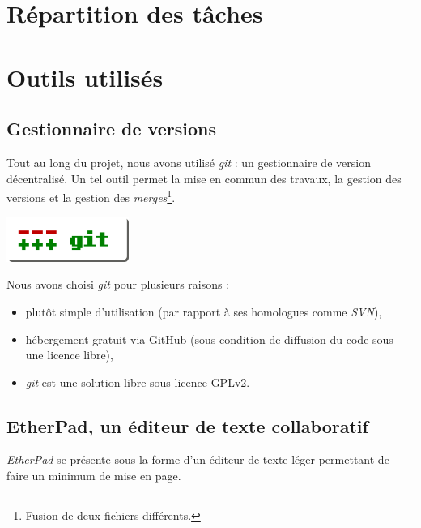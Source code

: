 \section{Répartition des tâches}

\section{Outils utilisés}

\subsection{Gestionnaire de versions}
Tout au long du projet, nous avons utilisé \emph{git} : un gestionnaire de version décentralisé. Un tel outil permet la mise en commun des travaux, la gestion des versions et la gestion des \emph{merges}\footnote{Fusion de deux fichiers différents.}. 

\begin{center}
	\includegraphics[width=0.3\textwidth]{files/outils/git}	
\end{center}

Nous avons choisi \emph{git} pour plusieurs raisons :

\begin{itemize}
\item plutôt simple d'utilisation (par rapport à ses homologues comme \emph{SVN}),
\item hébergement gratuit via GitHub (sous condition de diffusion du code sous une licence libre),
\item \emph{git} est une solution libre sous licence \gls{GPLv2}.
\end{itemize}

\subsection{EtherPad, un éditeur de texte collaboratif}
\emph{EtherPad} se présente sous la forme d'un éditeur de texte léger permettant de faire un minimum de mise en page.

